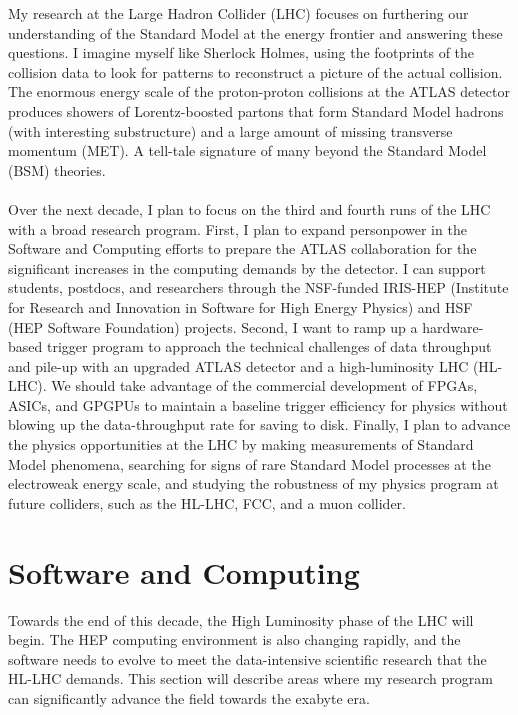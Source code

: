 \documentclass[10pt,a4paper,sans]{moderncv/moderncv} %
\begin{document}
My research at the Large Hadron Collider (LHC) focuses on furthering our understanding of the Standard Model at the energy frontier and answering these questions. I imagine myself like Sherlock Holmes, using the footprints of the collision data to look for patterns to reconstruct a picture of the actual collision. The enormous energy scale of the proton-proton collisions at the ATLAS detector produces showers of Lorentz-boosted partons that form Standard Model hadrons (with interesting substructure) and a large amount of missing transverse momentum (MET). A tell-tale signature of many beyond the Standard Model (BSM) theories.
\\
\\
Over the next decade, I plan to focus on the third and fourth runs of the LHC with a broad research program. First, I plan to expand personpower in the Software and Computing efforts to prepare the ATLAS collaboration for the significant increases in the computing demands by the detector. I can support students, postdocs, and researchers through the NSF-funded IRIS-HEP (Institute for Research and Innovation in Software for High Energy Physics) and HSF (HEP Software Foundation) projects. Second, I want to ramp up a hardware-based trigger program to approach the technical challenges of data throughput and pile-up with an upgraded ATLAS detector and a high-luminosity LHC (HL-LHC). We should take advantage of the commercial development of FPGAs, ASICs, and GPGPUs to maintain a baseline trigger efficiency for physics without blowing up the data-throughput rate for saving to disk. Finally, I plan to advance the physics opportunities at the LHC by making measurements of Standard Model phenomena, searching for signs of rare Standard Model processes at the electroweak energy scale, and studying the robustness of my physics program at future colliders, such as the HL-LHC, FCC, and a muon collider.

\section{Software and Computing}
Towards the end of this decade, the High Luminosity phase of the LHC will begin. The HEP computing environment is also changing rapidly, and the software needs to evolve to meet the data-intensive scientific research that the HL-LHC demands. This section will describe areas where my research program can significantly advance the field towards the exabyte era.
\end{document}
